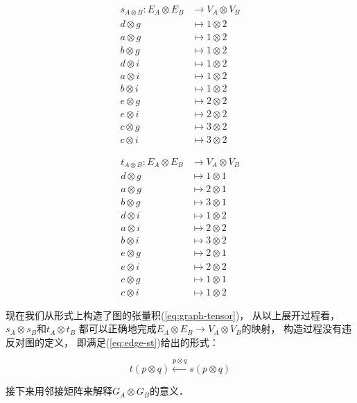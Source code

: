 \documentclass[10pt, openany]{book}
\begin{document}
\begin{minipage}{0.48\textwidth}
\[
\begin{aligned}
s_{A \otimes B}: E_A \otimes E_B &\to V_A \otimes V_B \\
d \otimes g &\mapsto 1 \otimes 2 \\
a \otimes g &\mapsto 1 \otimes 2 \\
b \otimes g &\mapsto 1 \otimes 2 \\
d \otimes i &\mapsto 1 \otimes 2 \\
a \otimes i &\mapsto 1 \otimes 2 \\
b \otimes i &\mapsto 1 \otimes 2 \\
e \otimes g &\mapsto 2 \otimes 2 \\
e \otimes i &\mapsto 2 \otimes 2 \\
c \otimes g &\mapsto 3 \otimes 2 \\
c \otimes i &\mapsto 3 \otimes 2
\end{aligned}
\]
\end{minipage}
\begin{minipage}{0.48\textwidth}
\[
\begin{aligned}
t_{A \otimes B}: E_A \otimes E_B &\to V_A \otimes V_B \\
d \otimes g &\mapsto 1 \otimes 1 \\
a \otimes g &\mapsto 2 \otimes 1 \\
b \otimes g &\mapsto 3 \otimes 1 \\
d \otimes i &\mapsto 1 \otimes 2 \\
a \otimes i &\mapsto 2 \otimes 2 \\
b \otimes i &\mapsto 3 \otimes 2 \\
e \otimes g &\mapsto 2 \otimes 1 \\
e \otimes i &\mapsto 2 \otimes 2 \\
c \otimes g &\mapsto 1 \otimes 1 \\
c \otimes i &\mapsto 1 \otimes 2
\end{aligned}
\]
\end{minipage}

现在我们从形式上构造了图的张量积(\ref{eq:graph-tensor})，
从以上展开过程看，
$s_A \otimes s_B$和$t_A \otimes t_B$
都可以正确地完成$E_A \otimes E_B \to V_A \otimes V_B$的映射，
构造过程没有违反对图的定义，
即满足(\ref{eq:edge-st})给出的形式：

$$
t(p \otimes q) \stackrel{p \otimes q}{\longleftarrow} s(p \otimes q)
$$

接下来用邻接矩阵来解释$G_A \otimes G_B$的意义．
\end{document}
